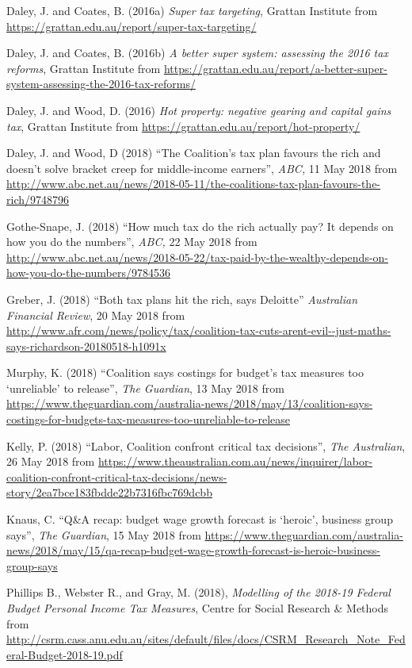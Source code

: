 \documentclass[submission]{grattan}\usepackage[]{graphicx}\usepackage[]{color}
\begin{document}
Daley, J. and Coates, B. (2016a) \emph{Super tax targeting}, Grattan Institute from \url{https://grattan.edu.au/report/super-tax-targeting/}

Daley, J. and Coates, B. (2016b) \emph{A better super system: assessing the 2016 tax reforms}, Grattan Institute from \url{https://grattan.edu.au/report/a-better-super-system-assessing-the-2016-tax-reforms/}

Daley, J. and Wood, D. (2016) \emph{Hot property: negative gearing and capital gains tax}, Grattan Institute from \url{https://grattan.edu.au/report/hot-property/}

Daley, J. and Wood, D (2018) ``The Coalition's tax plan favours the rich and doesn't solve bracket creep for middle-income earners'', \emph{ABC,} 11 May 2018 from \url{http://www.abc.net.au/news/2018-05-11/the-coalitions-tax-plan-favours-the-rich/9748796}

Gothe-Snape, J. (2018) ``How much tax do the rich actually pay? It depends on how you do the numbers'', \emph{ABC,} 22 May 2018 from \url{http://www.abc.net.au/news/2018-05-22/tax-paid-by-the-wealthy-depends-on-how-you-do-the-numbers/9784536}

Greber, J. (2018) ``Both tax plans hit the rich, says Deloitte'' \emph{Australian Financial Review}, 20 May 2018 from \url{http://www.afr.com/news/policy/tax/coalition-tax-cuts-arent-evil--just-maths-says-richardson-20180518-h1091x}

Murphy, K. (2018) ``Coalition says costings for budget's tax measures too `unreliable' to release'', \emph{The Guardian}, 13 May 2018 from \url{https://www.theguardian.com/australia-news/2018/may/13/coalition-says-costings-for-budgets-tax-measures-too-unreliable-to-release}

Kelly, P. (2018) ``Labor, Coalition confront critical tax decisions'', \emph{The Australian}, 26 May 2018 from \url{https://www.theaustralian.com.au/news/inquirer/labor-coalition-confront-critical-tax-decisions/news-story/2ea7bce183fbdde22b7316fbc769dcbb}

Knaus, C. ``Q\&A recap: budget wage growth forecast is `heroic', business group says'', \emph{The Guardian}, 15 May 2018 from \url{https://www.theguardian.com/australia-news/2018/may/15/qa-recap-budget-wage-growth-forecast-is-heroic-business-group-says}

Phillips B., Webster R., and Gray, M. (2018), \emph{Modelling of the 2018-19 Federal Budget Personal Income Tax Measures}, Centre for Social Research \& Methods from \url{http://csrm.cass.anu.edu.au/sites/default/files/docs/CSRM_Research_Note_Federal-Budget-2018-19.pdf}
\end{document}
